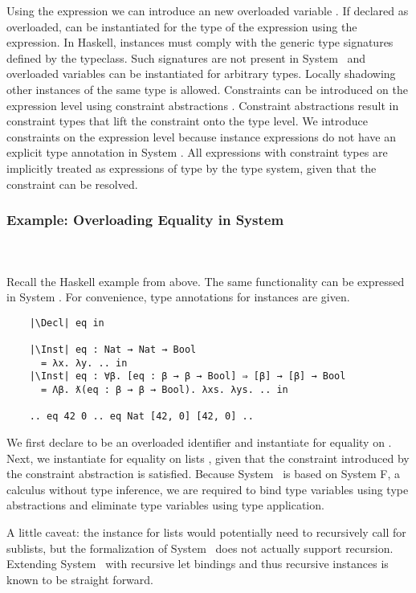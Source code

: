 \noindent Using the  expression we can introduce an new overloaded variable . 
If declared as overloaded,  can be instantiated for the type  of the expression  using the  expression.
In Haskell, instances must comply with the generic type signatures defined by the typeclass. Such signatures are not present in System \Fo\ and overloaded variables can be instantiated for arbitrary types. 
Locally shadowing other instances of the same type is allowed. 
Constraints can be introduced on the expression level using constraint abstractions . 
Constraint abstractions result in constraint types  that lift the constraint onto the type level. 
We introduce constraints on the expression level because instance expressions do not have an explicit type annotation in System \Fo.
All expressions with constraint types  are implicitly treated as expressions of type  by the type system, given that the constraint  can be resolved.

\subsubsection{Example: Overloading Equality in System \Fo}\hfill\\\\
Recall the Haskell example from above. 
The same functionality can be expressed in System \Fo. 
For convenience, type annotations for instances are given.
\begin{verbatim}
    |\Decl| eq in

    |\Inst| eq : Nat → Nat → Bool 
      = λx. λy. .. in
    |\Inst| eq : ∀β. [eq : β → β → Bool] ⇒ [β] → [β] → Bool 
      = Λβ. ƛ(eq : β → β → Bool). λxs. λys. .. in

    .. eq 42 0 .. eq Nat [42, 0] [42, 0] .. 
\end{verbatim} 
We first declare  to be an overloaded identifier and instantiate  for equality on . 
Next, we instantiate  for equality on lists \inl{[β]}, given that the constraint  introduced by the constraint abstraction is satisfied. 
Because System \Fo\ is based on System F, a calculus without type inference, we are required to bind type variables using type abstractions  and eliminate type variables using type application. 

\noindent A little caveat: the instance for lists would potentially need to recursively call  for sublists, but the formalization of System \Fo\ does not actually support recursion. 
Extending System \Fo\ with recursive let bindings and thus recursive instances is known to be straight forward. 

